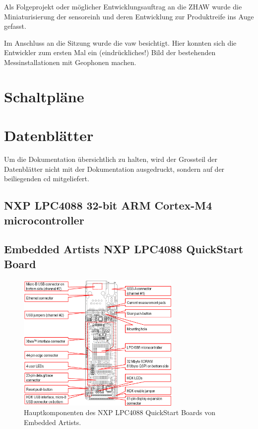 Als Folgeprojekt oder möglicher Entwicklungsauftrag an die ZHAW wurde die Miniaturisierung  der \gls{sensoreinh} und deren Entwicklung zur Produktreife ins Auge gefasst.

Im Anschluss an die Sitzung wurde die \gls{vaw} besichtigt. Hier konnten sich die Entwickler zum ersten Mal ein (eindrückliches!) Bild der bestehenden Messinstallationen mit Geophonen machen.

\clearpage
\section{Schaltpläne}\label{app.pcb}




\section{Datenblätter}\label{app.datasheets}
Um die Dokumentation übersichtlich zu halten, wird der Grossteil der Datenblätter nicht mit der Dokumentation ausgedruckt, sondern auf der beiliegenden \gls{cd} mitgeliefert.


\subsection{NXP LPC4088 32-bit ARM Cortex-M4 microcontroller}
\label{ds.lpc4088}


\subsection{Embedded Artists NXP LPC4088 QuickStart Board}

\begin{figure}
	\centering		\includegraphics[width=0.7\textwidth]{images/datasheets/lpc4088_qsb_key_components_reva.png}
	\caption{Hauptkomponenten des NXP LPC4088 QuickStart Boards von Embedded Artists.}
	\label{fig.NXP_LPC4088_QSB_comps}
\end{figure}

